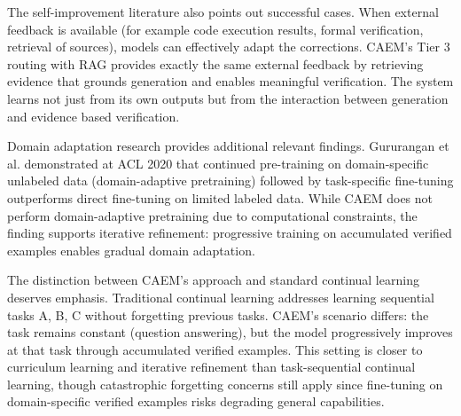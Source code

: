 The self-improvement literature also points out successful cases. When external feedback is available (for example code execution results, formal verification, retrieval of sources), models can effectively adapt the corrections. CAEM's Tier 3 routing with RAG provides exactly the same external feedback by retrieving evidence that grounds generation and enables meaningful verification. The system learns not just from its own outputs but from the interaction between generation and evidence based verification.

Domain adaptation research provides additional relevant findings. Gururangan et al. \cite{gururangan-etal-2020-dont} demonstrated at ACL 2020 that continued pre-training on domain-specific unlabeled data (domain-adaptive pretraining) followed by task-specific fine-tuning outperforms direct fine-tuning on limited labeled data. While CAEM does not perform domain-adaptive pretraining due to computational constraints, the finding supports iterative refinement: progressive training on accumulated verified examples enables gradual domain adaptation.

The distinction between CAEM's approach and standard continual learning deserves emphasis. Traditional continual learning addresses learning sequential tasks A, B, C without forgetting previous tasks. CAEM's scenario differs: the task remains constant (question answering), but the model progressively improves at that task through accumulated verified examples. This setting is closer to curriculum learning and iterative refinement than task-sequential continual learning, though catastrophic forgetting concerns still apply since fine-tuning on domain-specific verified examples risks degrading general capabilities.

